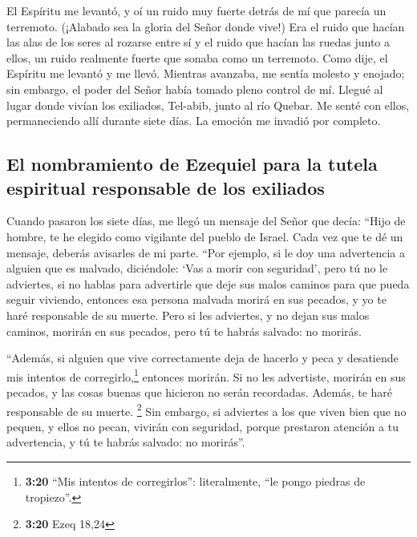  El Espíritu me levantó, y oí un ruido muy fuerte detrás
de mí que parecía un terremoto. (¡Alabado sea la gloria del Señor donde
vive!)  Era el ruido que hacían las alas de los seres al
rozarse entre sí y el ruido que hacían las ruedas junto a ellos, un
ruido realmente fuerte que sonaba como un terremoto. 
Como dije, el Espíritu me levantó y me llevó. Mientras avanzaba, me
sentía molesto y enojado; sin embargo, el poder del Señor había tomado
pleno control de mí.  Llegué al lugar donde vivían los
exiliados, Tel-abib, junto al río Quebar. Me senté con ellos,
permaneciendo allí durante siete días. La emoción me invadió por
completo.

\hypertarget{el-nombramiento-de-ezequiel-para-la-tutela-espiritual-responsable-de-los-exiliados}{%
\subsection{El nombramiento de Ezequiel para la tutela espiritual
responsable de los
exiliados}\label{el-nombramiento-de-ezequiel-para-la-tutela-espiritual-responsable-de-los-exiliados}}

 Cuando pasaron los siete días, me llegó un mensaje del
Señor que decía:  ``Hijo de hombre, te he elegido como
vigilante del pueblo de Israel. Cada vez que te dé un mensaje, deberás
avisarles de mi parte.  ``Por ejemplo, si le doy una
advertencia a alguien que es malvado, diciéndole: `Vas a morir con
seguridad', pero tú no le adviertes, si no hablas para advertirle que
deje sus malos caminos para que pueda seguir viviendo, entonces esa
persona malvada morirá en sus pecados, y yo te haré responsable de su
muerte.  Pero si les adviertes, y no dejan sus malos
caminos, morirán en sus pecados, pero tú te habrás salvado: no morirás.

 ``Además, si alguien que vive correctamente deja de
hacerlo y peca y desatiende mis intentos de corregirlo,\footnote{\textbf{3:20}
  ``Mis intentos de corregirlos'': literalmente, ``le pongo piedras de
  tropiezo''.} entonces morirán. Si no les advertiste, morirán en sus
pecados, y las cosas buenas que hicieron no serán recordadas. Además, te
haré responsable de su muerte. \footnote{\textbf{3:20} Ezeq 18,24}
 Sin embargo, si adviertes a los que viven bien que no
pequen, y ellos no pecan, vivirán con seguridad, porque prestaron
atención a tu advertencia, y tú te habrás salvado: no morirás''.


